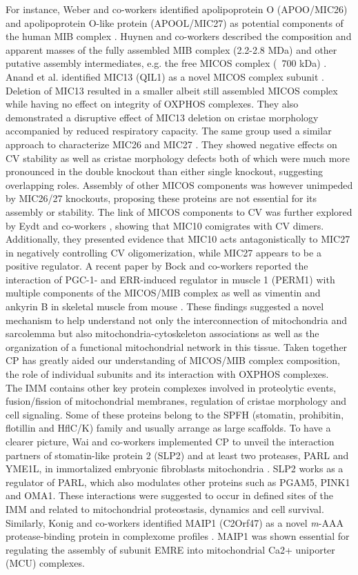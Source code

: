For instance, Weber and co-workers identified apolipoprotein O (APOO/MIC26) and apolipoprotein O-like protein (APOOL/MIC27) as potential components of the human MIB complex \cite{Weber_2013}. Huynen and co-workers described the composition and apparent masses of the fully assembled MIB complex (2.2-2.8 MDa) and other putative assembly intermediates, e.g. the free MICOS complex (~700 kDa) \cite{Huynen_2016}. Anand et al. identified MIC13 (QIL1) as a novel MICOS complex subunit \cite{Anand_2016}. Deletion of MIC13 resulted in a smaller albeit still assembled MICOS complex while having no effect on integrity of OXPHOS complexes. They also demonstrated a disruptive effect of MIC13 deletion on cristae morphology accompanied by reduced respiratory capacity. The same group used a similar approach to characterize MIC26 and MIC27 \cite{Anand_2020}. They showed negative effects on CV stability as well as cristae morphology defects both of which were much more pronounced in the double knockout than either single knockout, suggesting overlapping roles. Assembly of other MICOS components was however unimpeded by MIC26/27 knockouts, proposing these proteins are not essential for its assembly or stability. The link of MICOS components to CV was further explored by Eydt and co-workers \cite{Eydt_2017}, showing that MIC10 comigrates with CV dimers. Additionally, they presented evidence that MIC10 acts antagonistically to MIC27 in negatively controlling CV oligomerization, while MIC27 appears to be a positive regulator. A recent paper by Bock and co-workers reported the interaction of  PGC-1- and ERR-induced regulator in muscle 1 (PERM1) with multiple components of the MICOS/MIB complex as well as vimentin and ankyrin B in skeletal muscle from mouse \cite{Bock_2021}. These findings suggested a novel mechanism to help understand not only the interconnection of mitochondria and sarcolemma but also mitochondria-cytoskeleton associations as well as the organization of a functional mitochondrial network in this tissue. Taken together CP has greatly aided our understanding of MICOS/MIB complex composition, the role of individual subunits and its interaction with OXPHOS complexes.\\
The IMM contains other key protein complexes involved in proteolytic events, fusion/fission of mitochondrial membranes, regulation of cristae morphology and cell signaling. Some of these proteins belong to the SPFH (stomatin, prohibitin, flotillin and HflC/K) family and usually arrange as large scaffolds. To have a clearer picture, Wai and co-workers implemented CP to unveil the interaction partners of stomatin-like protein 2 (SLP2) and at least two proteases, PARL and YME1L, in immortalized embryonic fibroblasts mitochondria \cite{Wai_2016}. SLP2 works as a regulator of PARL, which also modulates other proteins such as PGAM5, PINK1 and OMA1. These interactions were suggested to occur in defined sites of the IMM and related to mitochondrial proteostasis, dynamics and cell survival. Similarly, Konig and co-workers identified MAIP1 (C2Orf47) as a novel \emph{m}-AAA protease-binding protein in complexome profiles \cite{Konig_2016}. MAIP1 was shown essential for regulating the assembly of subunit EMRE into mitochondrial Ca2+ uniporter (MCU) complexes.\\ 
